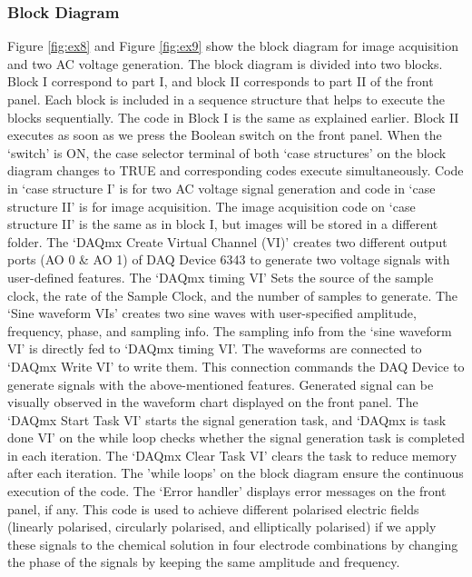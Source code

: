 \documentclass[journal=jacsat,manuscript=article]{achemso}
\begin{document}
\subsubsection{Block Diagram}
Figure \ref{fig:ex8} and Figure \ref{fig:ex9} show the block diagram
for image acquisition and two AC voltage generation. The block diagram
is divided into two blocks. Block I correspond to part I, and block II
corresponds to part II of the front panel. Each block is included in a
sequence structure that helps to execute the blocks sequentially. The
code in Block I is the same as explained earlier. Block II executes as
soon as we press the Boolean switch on the front panel. When the
‘switch’ is ON, the case selector terminal of both ‘case structures’
on the block diagram changes to TRUE and corresponding codes execute
simultaneously. Code in ‘case structure I’ is for two AC voltage
signal generation and code in ‘case structure II’ is for image
acquisition. The image acquisition code on ‘case structure II’ is the
same as in block I, but images will be stored in a different
folder. The ‘DAQmx Create Virtual Channel (VI)’ creates two different
output ports (AO 0 \& AO 1) of DAQ Device 6343 to generate two voltage
signals with user-defined features. The ‘DAQmx timing VI’ Sets the
source of the sample clock, the rate of the Sample Clock, and the
number of samples to generate. The ‘Sine waveform VIs’ creates two
sine waves with user-specified amplitude, frequency, phase, and
sampling info. The sampling info from the ‘sine waveform VI’ is
directly fed to ‘DAQmx timing VI'. The waveforms are connected to
‘DAQmx Write VI’ to write them.  This connection commands the DAQ
Device to generate signals with the above-mentioned
features. Generated signal can be visually observed in the waveform
chart displayed on the front panel. The ‘DAQmx Start Task VI’ starts
the signal generation task, and ‘DAQmx is task done VI’ on the while
loop checks whether the signal generation task is completed in each
iteration. The ‘DAQmx Clear Task VI’ clears the task to reduce memory
after each iteration. The 'while loops' on the block diagram ensure
the continuous execution of the code. The ‘Error handler’ displays
error messages on the front panel, if any. This code is used to
achieve different polarised electric fields (linearly polarised,
circularly polarised, and elliptically polarised) if we apply these
signals to the chemical solution in four electrode combinations by
changing the phase of the signals by keeping the same amplitude and
frequency.
\end{document}
